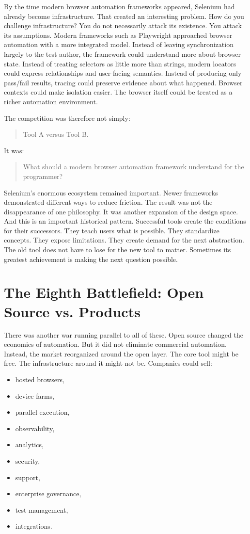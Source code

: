 \documentclass[11pt,twoside]{book}
\begin{document}
By the time modern browser automation frameworks appeared, Selenium had already become infrastructure.
That created an interesting problem.
How do you challenge infrastructure?
You do not necessarily attack its existence.
You attack its assumptions.
Modern frameworks such as Playwright approached browser automation with a more integrated model.
Instead of leaving synchronization largely to the test author, the framework could understand more about browser state.
Instead of treating selectors as little more than strings, modern locators could express relationships and user-facing semantics.
Instead of producing only pass/fail results, tracing could preserve evidence about what happened.
Browser contexts could make isolation easier.
The browser itself could be treated as a richer automation environment.

The competition was therefore not simply:
\begin{quote}
Tool A versus Tool B.
\end{quote}
It was:
\begin{quote}
What should a modern browser automation framework understand for the programmer?
\end{quote}

Selenium's enormous ecosystem remained important.
Newer frameworks demonstrated different ways to reduce friction.
The result was not the disappearance of one philosophy.
It was another expansion of the design space.
And this is an important historical pattern.
Successful tools create the conditions for their successors.
They teach users what is possible.
They standardize concepts.
They expose limitations.
They create demand for the next abstraction.
The old tool does not have to lose for the new tool to matter.
Sometimes its greatest achievement is making the next question possible.

\section*{The Eighth Battlefield: Open Source vs. Products}

There was another war running parallel to all of these.
Open source changed the economics of automation.
But it did not eliminate commercial automation.
Instead, the market reorganized around the open layer.
The core tool might be free.
The infrastructure around it might not be.
Companies could sell:
\begin{itemize}[nosep]
    \item hosted browsers,
    \item device farms,
    \item parallel execution,
    \item observability,
    \item analytics,
    \item security,
    \item support,
    \item enterprise governance,
    \item test management,
    \item integrations.
\end{itemize}
\end{document}
